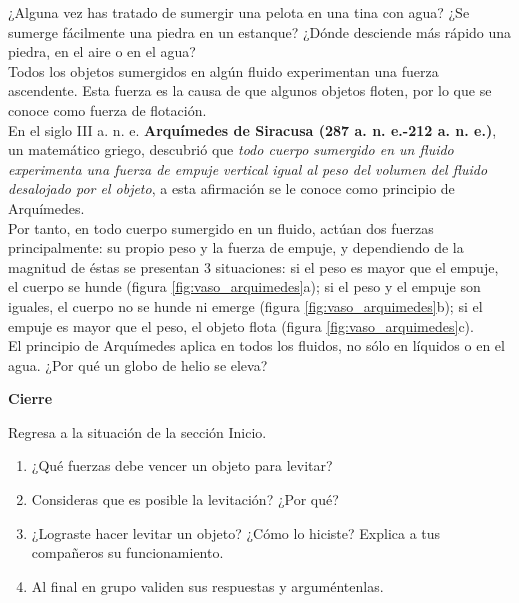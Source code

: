 \documentclass[11pt]{book}
\begin{document}
\begin{minipage}[t]{0.7\textwidth}
  ¿Alguna vez has tratado de sumergir una pelota en una tina con agua? ¿Se sumerge fácilmente una
  piedra en un estanque? ¿Dónde desciende más rápido una piedra, en el aire o en el agua?\\

  Todos los objetos sumergidos en algún fluido experimentan una fuerza ascendente. Esta fuerza es
  la causa de que algunos objetos floten, por lo que se conoce como fuerza de flotación.\\

  En el siglo III a. n. e. \textbf{Arquímedes de Siracusa (287 a. n. e.-212 a. n. e.)}, un matemático griego,
  descubrió que \emph{todo cuerpo sumergido en un fluido experimenta una fuerza de empuje vertical
    igual al peso del volumen del fluido desalojado por el objeto}, a esta afirmación se le conoce
  como principio de Arquímedes.\\

  Por tanto, en todo cuerpo sumergido en un fluido, actúan dos fuerzas principalmente: su propio
  peso y la fuerza de empuje, y dependiendo de la magnitud de éstas se presentan 3 situaciones:
  si el peso es mayor que el empuje, el cuerpo se hunde (figura \ref{fig:vaso_arquimedes}a); si el peso y el empuje son
  iguales, el cuerpo no se hunde ni emerge (figura \ref{fig:vaso_arquimedes}b); si el empuje es mayor que el peso, el
  objeto flota (figura \ref{fig:vaso_arquimedes}c).\\

  El principio de Arquímedes aplica en todos los fluidos, no sólo en líquidos o en el agua. ¿Por
  qué un globo de helio se eleva?\\
\end{minipage}

\begin{boxK}
  \begin{center}\textbf{\color{colorrds}Cierre}\end{center}
  Regresa a la situación de la sección Inicio.
  \begin{enumerate}
    \item ¿Qué fuerzas debe vencer un objeto para levitar?
    \item Consideras que es posible la levitación? ¿Por qué?
    \item ¿Lograste hacer levitar un objeto? ¿Cómo lo hiciste? Explica a tus compañeros su funcionamiento.
    \item Al final en grupo validen sus respuestas y arguméntenlas.
  \end{enumerate}
\end{boxK}
\newpage
\end{document}
